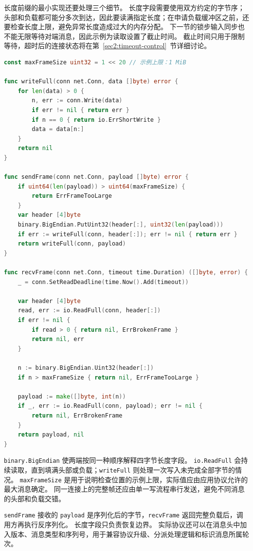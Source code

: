 长度前缀的最小实现还要处理三个细节。
长度字段需要使用双方约定的字节序；头部和负载都可能分多次到达，因此要读满指定长度；在申请负载缓冲区之前，还要检查长度上限，避免异常长度造成过大的内存分配。
下一节的锁步输入同步也不能无限等待对端消息，因此示例为读取设置了截止时间。
截止时间只用于限制等待，超时后的连接状态将在第~\ref{sec2:timeout-control}~节详细讨论。

\begin{tcolorbox}[title=长度前缀分帧与限时读取（概念示例）]
\begin{lstlisting}[style=codeblock, language=go]
const maxFrameSize uint32 = 1 << 20 // 示例上限：1 MiB

func writeFull(conn net.Conn, data []byte) error {
    for len(data) > 0 {
        n, err := conn.Write(data)
        if err != nil { return err }
        if n == 0 { return io.ErrShortWrite }
        data = data[n:]
    }
    return nil
}

func sendFrame(conn net.Conn, payload []byte) error {
    if uint64(len(payload)) > uint64(maxFrameSize) {
        return ErrFrameTooLarge
    }
    var header [4]byte
    binary.BigEndian.PutUint32(header[:], uint32(len(payload)))
    if err := writeFull(conn, header[:]); err != nil { return err }
    return writeFull(conn, payload)
}

func recvFrame(conn net.Conn, timeout time.Duration) ([]byte, error) {
    _ = conn.SetReadDeadline(time.Now().Add(timeout))

    var header [4]byte
    read, err := io.ReadFull(conn, header[:])
    if err != nil {
        if read > 0 { return nil, ErrBrokenFrame }
        return nil, err
    }

    n := binary.BigEndian.Uint32(header[:])
    if n > maxFrameSize { return nil, ErrFrameTooLarge }

    payload := make([]byte, int(n))
    if _, err := io.ReadFull(conn, payload); err != nil {
        return nil, ErrBrokenFrame
    }
    return payload, nil
}
\end{lstlisting}
\end{tcolorbox}

\texttt{binary.BigEndian} 使两端按同一种顺序解释四字节长度字段。
\texttt{io.ReadFull} 会持续读取，直到填满头部或负载；\texttt{writeFull} 则处理一次写入未完成全部字节的情况。
\texttt{maxFrameSize} 是用于说明检查位置的示例上限，实际值应由应用协议允许的最大消息确定。
同一连接上的完整帧还应由单一写流程串行发送，避免不同消息的头部和负载交错。

\texttt{sendFrame} 接收的 \texttt{payload} 是序列化后的字节，\texttt{recvFrame} 返回完整负载后，调用方再执行反序列化。
长度字段只负责恢复边界。
实际协议还可以在消息头中加入版本、消息类型和序列号，用于兼容协议升级、分派处理逻辑和标识消息所属轮次。

